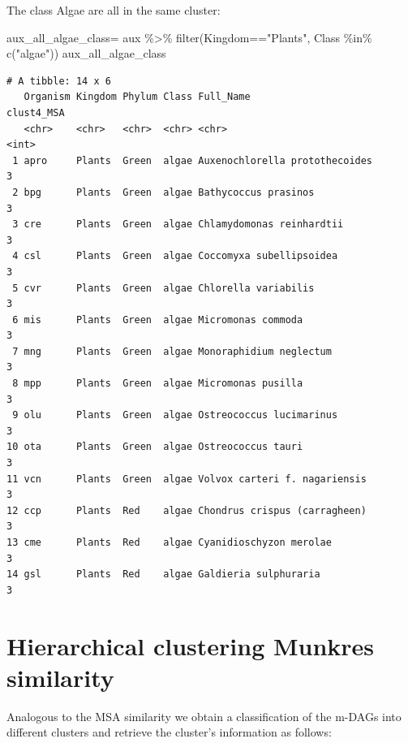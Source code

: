\documentclass[
  letterpaper,
  DIV=11,
  numbers=noendperiod]{scrreprt}
\newenvironment{Shaded}{}{}
\newcommand{\FunctionTok}[1]{\textcolor[rgb]{0.38,0.69,0.94}{#1}}
\newcommand{\NormalTok}[1]{\textcolor[rgb]{0.67,0.70,0.75}{#1}}
\newcommand{\OtherTok}[1]{\textcolor[rgb]{0.15,0.68,0.38}{#1}}
\newcommand{\SpecialCharTok}[1]{\textcolor[rgb]{0.34,0.71,0.76}{#1}}
\newcommand{\StringTok}[1]{\textcolor[rgb]{0.60,0.76,0.47}{#1}}
\begin{document}
The class Algae are all in the same cluster:

\begin{Shaded}
\begin{Highlighting}[]
\NormalTok{aux\_all\_algae\_class}\OtherTok{=}\NormalTok{ aux }\SpecialCharTok{\%\textgreater{}\%} 
  \FunctionTok{filter}\NormalTok{(Kingdom}\SpecialCharTok{==}\StringTok{"Plants"}\NormalTok{,}
\NormalTok{         Class }\SpecialCharTok{\%in\%} \FunctionTok{c}\NormalTok{(}\StringTok{"algae"}\NormalTok{))}
\NormalTok{aux\_all\_algae\_class}
\end{Highlighting}
\end{Shaded}

\begin{verbatim}
# A tibble: 14 x 6
   Organism Kingdom Phylum Class Full_Name                      clust4_MSA
   <chr>    <chr>   <chr>  <chr> <chr>                               <int>
 1 apro     Plants  Green  algae Auxenochlorella protothecoides          3
 2 bpg      Plants  Green  algae Bathycoccus prasinos                    3
 3 cre      Plants  Green  algae Chlamydomonas reinhardtii               3
 4 csl      Plants  Green  algae Coccomyxa subellipsoidea                3
 5 cvr      Plants  Green  algae Chlorella variabilis                    3
 6 mis      Plants  Green  algae Micromonas commoda                      3
 7 mng      Plants  Green  algae Monoraphidium neglectum                 3
 8 mpp      Plants  Green  algae Micromonas pusilla                      3
 9 olu      Plants  Green  algae Ostreococcus lucimarinus                3
10 ota      Plants  Green  algae Ostreococcus tauri                      3
11 vcn      Plants  Green  algae Volvox carteri f. nagariensis           3
12 ccp      Plants  Red    algae Chondrus crispus (carragheen)           3
13 cme      Plants  Red    algae Cyanidioschyzon merolae                 3
14 gsl      Plants  Red    algae Galdieria sulphuraria                   3
\end{verbatim}

\hypertarget{hierarchical-clustering-munkres-similarity}{%
\section{Hierarchical clustering Munkres
similarity}\label{hierarchical-clustering-munkres-similarity}}

Analogous to the MSA similarity we obtain a classification of the m-DAGs
into different clusters and retrieve the cluster's information as
follows:
\end{document}
